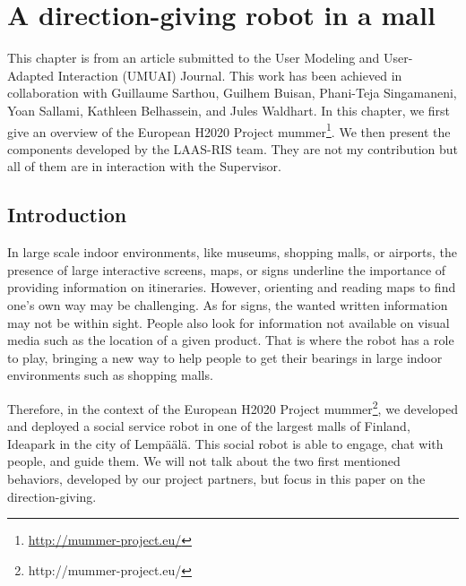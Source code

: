 \documentclass[a4paper,11pt,twoside]{StyleThese}
\begin{document}
\setcounter{chapter}{2} %
\dominitoc
\faketableofcontents
\fi

\chapter{A direction-giving robot in a mall}
\label{chapter:chap3}
\minitoc

This chapter is from an article submitted to the  User Modeling and User-Adapted Interaction (UMUAI) Journal. This work has been achieved in collaboration with Guillaume Sarthou, Guilhem Buisan, Phani-Teja Singamaneni, Yoan Sallami, Kathleen Belhassein, and Jules Waldhart. In this chapter, we first give an overview of the European H2020 Project \acrfull{mummer}\footnote{\url{http://mummer-project.eu/}}. We then present the components developed by the LAAS-RIS team. They are not my contribution but all of them are in interaction with the Supervisor.

\section{Introduction}

In large scale indoor environments, like museums, shopping malls, or airports, the presence of large interactive screens, maps, or signs underline the importance of providing information on itineraries. However, orienting and reading maps to find one's own way may be challenging. As for signs, the wanted written information may not be within sight. People also look for information not available on visual media such as the location of a given product. That is where the robot has a role to play, bringing a new way to help people to get their bearings in large indoor environments such as shopping malls.

Therefore, in the context of the European H2020 Project \acrshort{mummer}\footnote{http://mummer-project.eu/}, we developed and deployed a social service robot in one of the largest malls of Finland, Ideapark in the city of Lemp\"a\"al\"a. This social robot is able to engage, chat with people, and guide them. We will not talk about the two first mentioned behaviors, developed by our project partners, but focus in this paper on the direction-giving.
\end{document}
